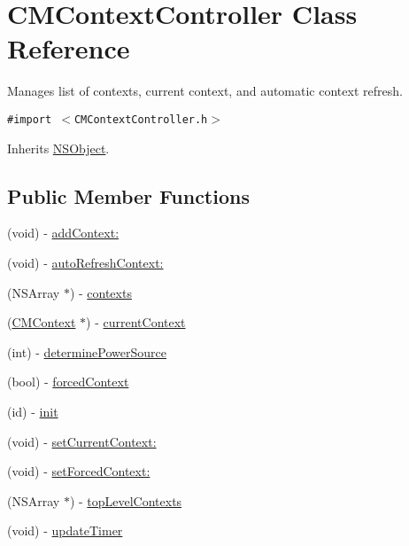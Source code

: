 \hypertarget{interface_c_m_context_controller}{
\section{CMContextController Class Reference}
\label{interface_c_m_context_controller}
}
Manages list of contexts, current context, and automatic context refresh.  


{\tt \#import $<$CMContextController.h$>$}

Inherits \hyperlink{class_n_s_object}{NSObject}.

\subsection*{Public Member Functions}
\begin{CompactItemize}
\item 
(void) - \hyperlink{interface_c_m_context_controller_9ada89df5ea4d23429cf0df7ea058c22}{addContext:}
\item 
(void) - \hyperlink{interface_c_m_context_controller_f7513bfc5b0449fac6a28d39abfa4b79}{autoRefreshContext:}
\item 
(NSArray $\ast$) - \hyperlink{interface_c_m_context_controller_4d59f2e4274f438d12924d0545a4c048}{contexts}
\item 
(\hyperlink{interface_c_m_context}{CMContext} $\ast$) - \hyperlink{interface_c_m_context_controller_da04581b2bd50c7d6ddac62a42037b9d}{currentContext}
\item 
(int) - \hyperlink{interface_c_m_context_controller_63988f35d5d21aab75337e47e8fa7184}{determinePowerSource}
\item 
(bool) - \hyperlink{interface_c_m_context_controller_0aa1da85f94500590161d868d9a18b6f}{forcedContext}
\item 
(id) - \hyperlink{interface_c_m_context_controller_6ba2a92209cbd3485e5c13164fb19e58}{init}
\item 
(void) - \hyperlink{interface_c_m_context_controller_1f6874bf405e00bf511a19a53a64e137}{setCurrentContext:}
\item 
(void) - \hyperlink{interface_c_m_context_controller_43c3430ac3b4dfefbe07a4d94bfffb6e}{setForcedContext:}
\item 
(NSArray $\ast$) - \hyperlink{interface_c_m_context_controller_ec19920f50873a90d8f1f3a54c4bb9cd}{topLevelContexts}
\item 
(void) - \hyperlink{interface_c_m_context_controller_6ad2cdc6ec1494e5f89a24cf5472600f}{updateTimer}
\end{CompactItemize}
